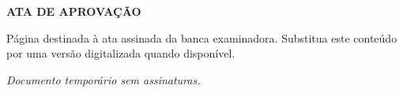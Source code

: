 \begin{titlepage}
    \thispagestyle{empty}
    \begin{center}
        \vspace*{5cm}
        \textbf{ATA DE APROVAÇÃO}\par
        \vspace{1cm}
        Página destinada à ata assinada da banca examinadora. Substitua este conteúdo por uma versão digitalizada quando disponível.
    \end{center}
    \vfill
    \begin{flushright}
        \textit{Documento temporário sem assinaturas.}
    \end{flushright}
\end{titlepage}
\clearpage

